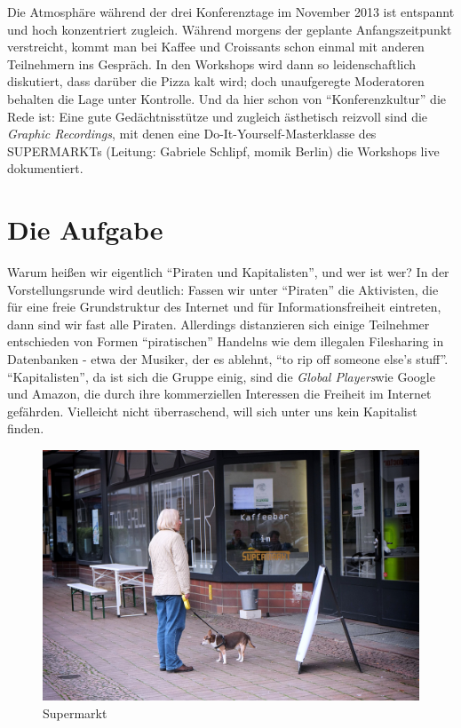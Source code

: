 \documentclass[a4paper,
fontsize=11pt,
oneside,
numbers=noperiodatend,
parskip=half-,
bibliography=totoc,
final
]{scrartcl}
\begin{document}
Die Atmosphäre während der drei Konferenztage im November 2013 ist
entspannt und hoch konzentriert zugleich. Während morgens der geplante
Anfangszeitpunkt verstreicht, kommt man bei Kaffee und Croissants schon
einmal mit anderen Teilnehmern ins Gespräch. In den Workshops wird dann
so leidenschaftlich diskutiert, dass darüber die Pizza kalt wird; doch
unaufgeregte Moderatoren behalten die Lage unter Kontrolle. Und da hier
schon von \enquote{Konferenzkultur} die Rede ist: Eine gute
Gedächtnisstütze und zugleich ästhetisch reizvoll sind die \emph{Graphic
Recordings}, mit denen eine Do-It-Yourself-Masterklasse des SUPERMARKTs
(Leitung: Gabriele Schlipf, momik Berlin) die Workshops live
dokumentiert.

\section*{Die Aufgabe}\label{die-aufgabe}

Warum heißen wir eigentlich \enquote{Piraten und Kapitalisten}, und wer
ist wer? In der Vorstellungsrunde wird deutlich: Fassen wir unter
\enquote{Piraten} die Aktivisten, die für eine freie Grundstruktur des
Internet und für Informationsfreiheit eintreten, dann sind wir fast alle
Piraten. Allerdings distanzieren sich einige Teilnehmer entschieden von
Formen \enquote{piratischen} Handelns wie dem illegalen Filesharing in
Datenbanken - etwa der Musiker, der es ablehnt, \enquote{to rip off
someone else's stuff}. \enquote{Kapitalisten}, da ist sich die Gruppe
einig, sind die \emph{Global Players}wie Google und Amazon, die durch
ihre kommerziellen Interessen die Freiheit im Internet gefährden.
Vielleicht nicht überraschend, will sich unter uns kein Kapitalist
finden.

\begin{figure}[htbp]
\centering
\includegraphics{./img/Supermarkt.jpg}
\caption{Supermarkt}
\end{figure}
\end{document}
